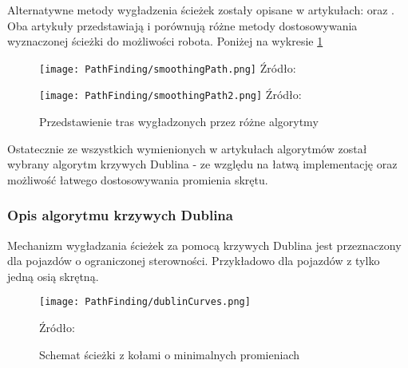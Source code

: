             Alternatywne metody wygładzenia ścieżek zostały opisane w artykułach:  \cite{Compare_PathSmoothing} oraz  \cite{Compare_PathSmoothing2}.
            Oba artykuły przedstawiają i porównują różne metody dostosowywania wyznaczonej ścieżki do możliwości robota.
            Poniżej na wykresie \ref{fig:smoothingPath_res}
            \begin{figure}[!ht]
                \centering
                \begin{minipage}{0.49\textwidth}
                    \centering
                    \texttt{[image: PathFinding/smoothingPath.png]}
                    Źródło: \cite{Compare_PathSmoothing}
                \end{minipage}
                \begin{minipage}{0.49\textwidth}
                    \centering
                    \texttt{[image: PathFinding/smoothingPath2.png]}
                    Źródło: \cite{Compare_PathSmoothing2}
                \end{minipage}
                \caption{Przedstawienie tras wygładzonych przez różne algorytmy}
                \label{fig:smoothingPath_res}
            \end{figure}

            Ostatecznie ze wszystkich wymienionych w artykułach algorytmów został wybrany algorytm krzywych Dublina - ze względu na łatwą implementację oraz możliwość łatwego dostosowywania promienia skrętu.

            \subsubsection{Opis algorytmu krzywych Dublina}
                Mechanizm wygładzania ścieżek za pomocą krzywych Dublina jest przeznaczony dla pojazdów o ograniczonej sterowności.
                Przykładowo dla pojazdów z tylko jedną osią skrętną.
                \begin{figure}[!ht]
                    \centering
                    \texttt{[image: PathFinding/dublinCurves.png]}
                    \caption{Schemat ścieżki z kołami o minimalnych promieniach}
                    \label{fig:dublinCurves}
                    Źródło: \cite{Compare_PathSmoothing}
                \end{figure}

